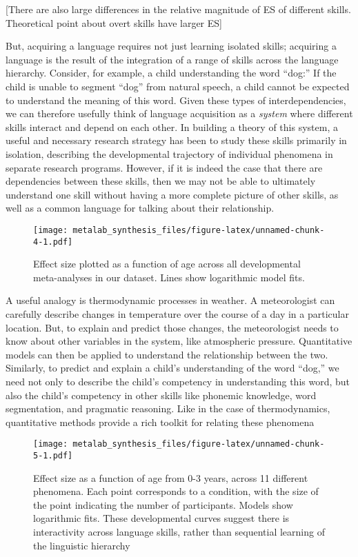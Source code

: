 \documentclass[english,floatsintext,man]{apa6}
\begin{document}
{[}There are also large differences in the relative magnitude of ES of
different skills. Theoretical point about overt skills have larger ES{]}

But, acquiring a language requires not just learning isolated skills;
acquiring a language is the result of the integration of a range of
skills across the language hierarchy. Consider, for example, a child
understanding the word \enquote{dog:} If the child is unable to segment
\enquote{dog} from natural speech, a child cannot be expected to
understand the meaning of this word. Given these types of
interdependencies, we can therefore usefully think of language
acquisition as a \emph{system} where different skills interact and
depend on each other. In building a theory of this system, a useful and
necessary research strategy has been to study these skills primarily in
isolation, describing the developmental trajectory of individual
phenomena in separate research programs. However, if it is indeed the
case that there are dependencies between these skills, then we may not
be able to ultimately understand one skill without having a more
complete picture of other skills, as well as a common language for
talking about their relationship.

\begin{figure}[htbp]
\centering
\texttt{[image: metalab\_synthesis\_files/figure-latex/unnamed-chunk-4-1.pdf]}
\caption{Effect size plotted as a function of age across all
developmental meta-analyses in our dataset. Lines show logarithmic model
fits.}
\end{figure}

A useful analogy is thermodynamic processes in weather. A meteorologist
can carefully describe changes in temperature over the course of a day
in a particular location. But, to explain and predict those changes, the
meteorologist needs to know about other variables in the system, like
atmospheric pressure. Quantitative models can then be applied to
understand the relationship between the two. Similarly, to predict and
explain a child's understanding of the word \enquote{dog,} we need not
only to describe the child's competency in understanding this word, but
also the child's competency in other skills like phonemic knowledge,
word segmentation, and pragmatic reasoning. Like in the case of
thermodynamics, quantitative methods provide a rich toolkit for relating
these phenomena

\begin{figure}[htbp]
\centering
\texttt{[image: metalab\_synthesis\_files/figure-latex/unnamed-chunk-5-1.pdf]}
\caption{Effect size as a function of age from 0-3 years, across 11
different phenomena. Each point corresponds to a condition, with the
size of the point indicating the number of participants. Models show
logarithmic fits. These developmental curves suggest there is
interactivity across language skills, rather than sequential learning of
the linguistic hierarchy}
\end{figure}
\end{document}
